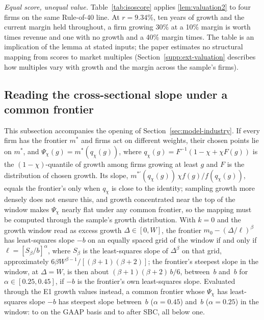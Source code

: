 \emph{Equal score, unequal value.} Table~\ref{tab:isoscore} applies \autoref{lem:valuation2} to four firms on the same Rule-of-40 line. At $r=9.34\%$, ten years of growth and the current margin held throughout, a firm growing 30\% at a 10\% margin is worth \IsoThirty{} times revenue and one with no growth and a 40\% margin \IsoZero{} times. The table is an implication of the lemma at stated inputs; the paper estimates no structural mapping from scores to market multiples (Section~\ref{supp:ext-valuation} describes how multiples vary with growth and the margin across the sample's firms).


\subsection{Reading the cross-sectional slope under a common frontier}\label{supp:model-slope}
This subsection accompanies the opening of Section~\ref{sec:model-industry}. If every firm has the frontier $m^*$ and firms act on different weights, their chosen points lie on $m^*$, and $\Psi_\chi(g)=m^*(q_\chi(g))$, where $q_\chi(g)=F^{-1}(1-\chi+\chi F(g))$ is the $(1-\chi)$-quantile of growth among firms growing at least $g$ and $F$ is the distribution of chosen growth. Its slope, $m^{*\prime}(q_\chi(g))\,\chi f(g)/f(q_\chi(g))$, equals the frontier's only when $q_\chi$ is close to the identity; sampling growth more densely does not ensure this, and growth concentrated near the top of the window makes $\Psi_\chi$ nearly flat under any common frontier, so the mapping must be computed through the sample's growth distribution. With $k=0$ and the growth window read as excess growth $\Delta\in[0,W]$, the frontier $m_0-(\Delta/\ell)^{\beta}$ has least-squares slope $-b$ on an equally spaced grid of the window if and only if $\ell=[S_\beta/b]^{\alpha}$, where $S_\beta$ is the least-squares slope of $\Delta^{\beta}$ on that grid, approximately $6\beta W^{\beta-1}/[(\beta+1)(\beta+2)]$; the frontier's steepest slope in the window, at $\Delta=W$, is then about $(\beta+1)(\beta+2)\,b/6$, between \PsiMultApproxLo$\,b$ and \PsiMultApproxHi$\,b$ for $\alpha\in[0.25,0.45]$, if $-b$ is the frontier's own least-squares slope. Evaluated through the E1 growth values instead, a common frontier whose $\Psi_\chi$ has least-squares slope $-b$ has steepest slope between \PsiMultLo$\,b$ ($\alpha=0.45$) and \PsiMultHi$\,b$ ($\alpha=0.25$) in the window: \PsiSteepConeOpLo{} to \PsiSteepConeOpHi{} on the GAAP basis and \PsiSteepConeCashLo{} to \PsiSteepConeCashHi{} after SBC, all below one.

